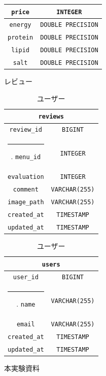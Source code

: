 \documentclass[a4paper]{ltjsarticle}
\makeatletter
\def\Hline{
    \noalign{\ifnum0=`}\fi\hrule \@height 3.\arrayrulewidth \futurelet
    \reserved@a\@xhline}
\makeatother
\begin{document}
\begin{table}[h]
\begin{minipage}[t]{.49\textwidth}
\begin{tabular}{|c|c|}
                    \verb|price| & \verb|INTEGER| \\ \hline
                    \verb|energy| & \verb|DOUBLE PRECISION| \\ \hline
                    \verb|protein| & \verb|DOUBLE PRECISION| \\ \hline
                    \verb|lipid| & \verb|DOUBLE PRECISION| \\ \hline
                    \verb|salt| & \verb|DOUBLE PRECISION| \\ \hline
                \end{tabular}
            \end{minipage}
        \end{table}
        \begin{table}[ht]
            \begin{minipage}[t]{.49\textwidth}
                \center
                \caption{レビュー}
                \label{reviews}
                \begin{tabular}{|c|c|}
                    \hline
                    \multicolumn{2}{|c|}{\texttt{reviews}} \\ \hline \hline
                    \verb|review_id| & \verb|BIGINT| \\ \Hline
                    \verb|menu_id| & \verb|INTEGER| \\ \hline
                    \verb|evaluation| & \verb|INTEGER| \\ \hline
                    \verb|comment| & \verb|VARCHAR(255)| \\ \hline
                    \verb|image_path| & \verb|VARCHAR(255)| \\ \hline
                    \verb|created_at| & \verb|TIMESTAMP| \\ \hline
                    \verb|updated_at| & \verb|TIMESTAMP| \\ \hline
                \end{tabular}
            \end{minipage}
            \begin{minipage}[t]{.49\textwidth}
                \center
                \caption{ユーザー}
                \label{users}
                \begin{tabular}{|c|c|}
                    \hline
                    \multicolumn{2}{|c|}{\texttt{users}} \\ \hline \hline
                    \verb|user_id| & \verb|BIGINT| \\ \Hline
                    \verb|name| & \verb|VARCHAR(255)| \\ \hline
                    \verb|email| & \verb|VARCHAR(255)| \\ \hline
                    \verb|created_at| & \verb|TIMESTAMP| \\ \hline
                    \verb|updated_at| & \verb|TIMESTAMP| \\ \hline
                \end{tabular}
            \end{minipage}
        \end{table}

\clearpage

\begin{thebibliography}{9}
     本実験資料
\end{thebibliography}
\end{document}
